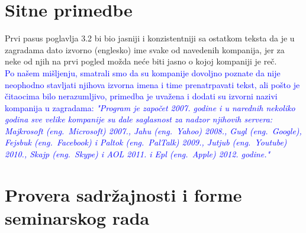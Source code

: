 \documentclass[a4paper]{report}
\newcommand{\odgovor}[1]{\textcolor{blue}{#1}}
\begin{document}
\section{Sitne primedbe}
Prvi pasus poglavlja 3.2 bi bio jasniji i konzistentniji sa ostatkom teksta da je u zagradama dato izvorno (englesko) ime svake od navedenih kompanija, jer za neke od njih na prvi pogled možda neće biti jasno o kojoj kompaniji je reč.
\\
\odgovor {Po našem mišljenju, smatrali smo da su kompanije dovoljno poznate da nije neophodno stavljati njihova izvorna imena i time prenatrpavati tekst, ali pošto je čitaocima bilo nerazumljivo, primedba je uvažena i dodati su izvorni nazivi kompanija u zagradama: \emph{"Program je započet 2007. godine i u narednih nekoliko godina sve velike kompanije su dale saglasnost za nadzor njihovih servera: Majkrosoft (eng.~{\em Microsoft}) 2007., Jahu (eng.~{\em Yahoo}) 2008., Gugl (eng.~{\em Google}), Fejsbuk (eng.~{\em Facebook}) i Paltok (eng.~{\em PalTalk}) 2009., Jutjub (eng.~{\em Youtube}) 2010., Skajp (eng.~{\em Skype}) i AOL 2011. i Epl (eng.~{\em Apple}) 2012. godine."}}

\section{Provera sadržajnosti i forme seminarskog rada}
\end{document}
